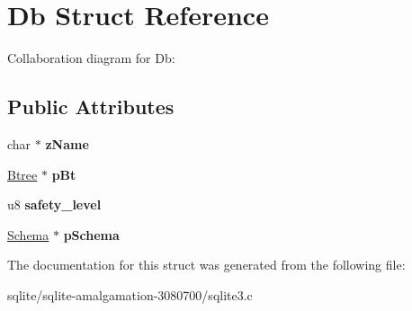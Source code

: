 \hypertarget{struct_db}{\section{Db Struct Reference}
\label{struct_db}
}


Collaboration diagram for Db\+:
\subsection*{Public Attributes}
\begin{DoxyCompactItemize}
\item 
\hypertarget{struct_db_a6df2b5d7c8fd68e92cea961d9e3b279b}{char $\ast$ {\bfseries z\+Name}}\label{struct_db_a6df2b5d7c8fd68e92cea961d9e3b279b}

\item 
\hypertarget{struct_db_a0633e5a6abfc39246d07cc6a417a5852}{\hyperlink{struct_btree}{Btree} $\ast$ {\bfseries p\+Bt}}\label{struct_db_a0633e5a6abfc39246d07cc6a417a5852}

\item 
\hypertarget{struct_db_a04597a5c023d8b328193450b177ff24c}{u8 {\bfseries safety\+\_\+level}}\label{struct_db_a04597a5c023d8b328193450b177ff24c}

\item 
\hypertarget{struct_db_afd8647a83a4a7053231b92814520d6d4}{\hyperlink{struct_schema}{Schema} $\ast$ {\bfseries p\+Schema}}\label{struct_db_afd8647a83a4a7053231b92814520d6d4}

\end{DoxyCompactItemize}


The documentation for this struct was generated from the following file\+:\begin{DoxyCompactItemize}
\item 
sqlite/sqlite-\/amalgamation-\/3080700/sqlite3.\+c\end{DoxyCompactItemize}
